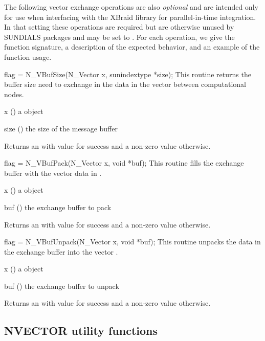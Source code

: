The following vector exchange operations are also \textit{optional} and are
intended only for use when interfacing with the XBraid library for
parallel-in-time integration. In that setting these operations are required but
are otherwise unused by SUNDIALS packages and may be set to . For each
operation, we give the function signature, a description of the expected
behavior, and an example of the function usage.

{
  flag = N\_VBufSize(N\_Vector x, sunindextype *size);
}
{
  This routine returns the buffer size need to exchange in the data in the
  vector  between computational nodes.
}
{
  \begin{args}[size]
  \item[x] () a {\nvector} object
  \item[size] () the size of the message buffer
  \end{args}
}
{
  Returns an  with value  for success and a non-zero value otherwise.
}
{}

{
  flag = N\_VBufPack(N\_Vector x, void *buf);
}
{
  This routine fills the exchange buffer  with the vector data in .
}
{
  \begin{args}[buf]
  \item[x] () a {\nvector} object
  \item[buf] () the exchange buffer to pack
  \end{args}
}
{
  Returns an  with value  for success and a non-zero value otherwise.
}
{}

{
  flag = N\_VBufUnpack(N\_Vector x, void *buf);
}
{
  This routine unpacks the data in the exchange buffer  into the vector
  .
}
{
  \begin{args}[buf]
  \item[x] () a {\nvector} object
  \item[buf] () the exchange buffer to unpack
  \end{args}
}
{
  Returns an  with value  for success and a non-zero value otherwise.
}
{}



\subsection{NVECTOR utility functions}\label{ss:nvecutils}

